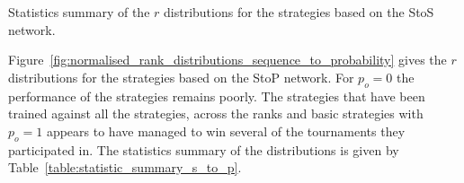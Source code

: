 \begin{table}[!htbp]
    \begin{center}
    \resizebox{\textwidth}{!}{
        
    }
\end{center}
\caption{Statistics summary of the \(r\) distributions for the strategies
based on the StoS network.}\label{table:statistic_summary_s_to_s}
\end{table}

Figure~\ref{fig:normalised_rank_distributions_sequence_to_probability} gives the
\(r\) distributions for the strategies based on the StoP network. For \(p_o=0\)
the performance of the strategies remains poorly. The strategies that have been
trained against all the strategies, across the ranks and basic strategies with
\(p_o=1\) appears to have managed to win several of the tournaments they
participated in. The statistics summary of the distributions is given by
Table~\ref{table:statistic_summary_s_to_p}.

